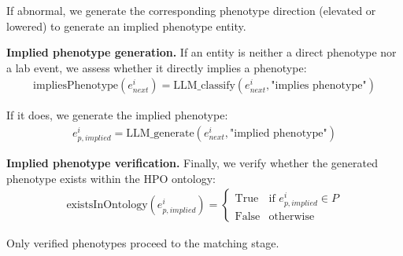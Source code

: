 If abnormal, we generate the corresponding phenotype direction (elevated or lowered) to generate an implied phenotype entity.

\textbf{Implied phenotype generation.} If an entity is neither a direct phenotype nor a lab event, we assess whether it directly implies a phenotype:
\begin{align}
\text{impliesPhenotype}(e_{next}^i) = \text{LLM\_classify}(e_{next}^i, \text{"implies phenotype"})
\end{align}

If it does, we generate the implied phenotype:
\begin{align}
e_{p,implied}^i = \text{LLM\_generate}(e_{next}^i, \text{"implied phenotype"})
\end{align}

\textbf{Implied phenotype verification.} Finally, we verify whether the generated phenotype exists within the HPO ontology:
\begin{align}
\text{existsInOntology}(e_{p,implied}^i) = 
\begin{cases}
\text{True} & \text{if } e_{p,implied}^i \in P \\
\text{False} & \text{otherwise}
\end{cases}
\end{align}

Only verified phenotypes proceed to the matching stage.

